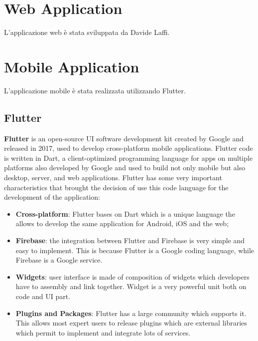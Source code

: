 \documentclass[12pt,a4paper,twoside,openright,titlepage]{book}
\begin{document}
\section{Web Application}
L'applicazione web è stata sviluppata da Davide Laffi.

\section{Mobile Application}
L'applicazione mobile è stata realizzata utilizzando Flutter.

\subsection{Flutter}
\textbf{Flutter} is an open-source UI software development kit created by Google and released in 2017, used to develop cross-platform mobile applications. Flutter code is written in Dart, a client-optimized programming language for apps on multiple platforms also developed by Google and used to build not only mobile but also desktop, server, and web applications. Flutter has some very important characteristics that brought the decision of use this code language for the development of the application:
\begin{itemize}
\item \textbf{Cross-platform}: Flutter bases on Dart which is a unique language the allows to develop the same application for Android, iOS and the web;
\item \textbf{Firebase}: the integration between Flutter and Firebase is very simple and easy to implement. This is because Flutter is a Google coding language, while Firebase is a Google service. 
\item \textbf{Widgets}: user interface is made of composition of widgets which developers have to assembly and link together. Widget is a very powerful unit both on code and UI part.
\item \textbf{Plugins and Packages}: Flutter has a large community which supports it. This allows most expert users to release plugins which are external libraries which permit to implement and integrate lots of services.
\end{itemize}
\end{document}
